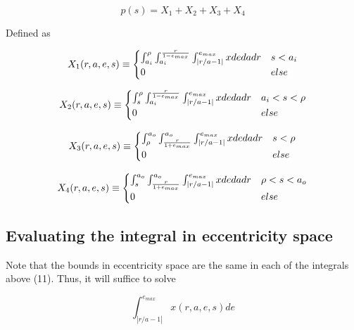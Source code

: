\documentclass{article}
\begin{document}
	\begin{equation}
	p(s) = X_1 + X_2 + X_3 + X_4
	\end{equation}
	
	Defined as 
	
	\[	
	\begin{array}{@{} r @{} c @{} l @{} }
	X_1(r, a, e, s) \equiv 
	\begin{cases}
	\int^\rho_{a_{i}}\int^\frac{r}{1 - e_{max}}_{a_{i}} \int^{e_{max}}_{|r/a - 1|} x de da dr  & s < a_{i}\\
	0  &  else
	\end{cases}
	\end{array}
	\]

	\[	
	\begin{array}{@{} r @{} c @{} l @{} }
	X_2(r, a, e, s) \equiv 
	\begin{cases}
	\int^\rho_{s}\int^\frac{r}{1 - e_{max}}_{a_{i}} \int^{e_{max}}_{|r/a - 1|} x de da dr  & a_{i} < s < \rho\\
	0  &  else
	\end{cases}
	\end{array}
	\]
	
	\[	
	\begin{array}{@{} r @{} c @{} l @{} }
	X_3(r, a, e, s) \equiv 
	\begin{cases}
	\int^{a_{o}}_\rho \int^{a_{o}}_\frac{r}{1 + e_{max}} \int^{e_{max}}_{|r/a - 1|} x de da dr  & s < \rho \\
	0  &  else
	\end{cases}
	\end{array}
	\]
	
	\[	
	\begin{array}{@{} r @{} c @{} l @{} }
	X_4(r, a, e, s) \equiv 
	\begin{cases}
	\int^{a_{o}}_s \int^{a_{o}}_\frac{r}{1 + e_{max}} \int^{e_{max}}_{|r/a - 1|} x de da dr  & \rho < s < a_{o} \\
	0  &  else
	\end{cases}
	\end{array}
	\]
	
	\subsection{Evaluating the integral in eccentricity space}
	Note that the bounds in eccentricity space are the same in each of the integrals above (11). Thus, it will suffice to solve 
	
	\begin{equation*}
	\int^{e_{max}}_{|r/a - 1|} x(r,a,e,s) de
	\end{equation*}
	
\end{document}
